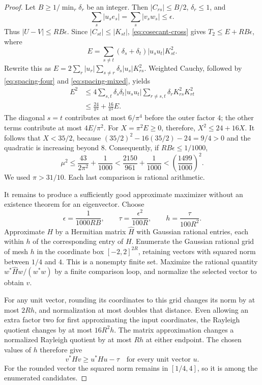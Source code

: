 \begin{proof}
Let $B\geq1/\min_r\delta_r$ be an integer.  Then
$|C_{rs}|\leq B/2$, $\delta_r\leq1$, and
\[
 \sum_s|u_se_s|=\sum_s|v_sw_s|\leq\epsilon.
\]
Thus $|U-V|\leq RB\epsilon$.  Since $|C_{st}|\leq|K_{st}|$,
\eqref{eq:cosecant-cross} gives $T_2\leq E+RB\epsilon$, where
\[
 E=\sum_{s\ne t}(\delta_s+\delta_t)|u_su_t|K_{st}^2.
\]
Rewrite this as
$E=2\sum_r|u_r|\sum_{s\ne r}\delta_s|u_s|K_{rs}^2$.
Weighted Cauchy, followed by
\eqref{eq:spacing-four} and \eqref{eq:spacing-mixed}, yields
\begin{align*}
 E^2
 &\leq4\sum_{s,t}\delta_s\delta_t|u_su_t|
           \sum_{r\ne s,t}\delta_rK_{rs}^2K_{rt}^2\\
 &\leq\frac{24}{\pi^4}+\frac{16}{\pi^2}E.
\end{align*}
The diagonal $s=t$ contributes at most $6/\pi^4$ before the
outer factor $4$; the other terms contribute at most $4E/\pi^2$.
For $X=\pi^2E\geq0$, therefore, $X^2\leq24+16X$.
It follows that $X<35/2$, because
$(35/2)^2-16(35/2)-24=9/4>0$ and the quadratic is increasing
beyond $8$.  Consequently, if $RB\epsilon\leq1/1000$,
\begin{equation}
 \mu^2\leq\frac{43}{2\pi^2}+\frac1{1000}
 <\frac{2150}{961}+\frac1{1000}
 <\left(\frac{1499}{1000}\right)^2.
 \label{eq:approximate-spectral-bound}
\end{equation}
We used $\pi>31/10$.  Each last comparison is rational arithmetic.

It remains to produce a sufficiently good approximate maximizer
without an existence theorem for an eigenvector.  Choose
\[
 \epsilon=\frac1{1000RB},\qquad
 \tau=\frac{\epsilon^2}{100R},\qquad
 h=\frac{\tau}{100R^2}.
\]
Approximate $H$ by a Hermitian matrix $\widehat H$ with Gaussian
rational entries, each within $h$ of the corresponding entry of
$H$.  Enumerate the Gaussian rational grid of mesh $h$ in the
coordinate box $[-2,2]^{2R}$, retaining vectors with squared norm
between $1/4$ and $4$.  This is a nonempty finite set.  Maximize
the rational quantity
$w^*\widehat H w/(w^*w)$ by a finite comparison loop, and normalize
the selected vector to obtain $v$.

For any unit vector, rounding its coordinates to this grid changes
its norm by at most $2Rh$, and normalization at most doubles that
distance.  Even allowing an extra factor two for first approximating
the input coordinates, the Rayleigh quotient changes by at most
$16R^2h$.  The matrix approximation changes a normalized Rayleigh
quotient by at most $Rh$ at either endpoint.  The chosen values of
$h$ therefore give
\begin{equation}
 v^*Hv\geq u^*Hu-\tau
 \quad\text{for every unit vector }u.
 \label{eq:grid-maximizer}
\end{equation}
For the rounded vector the squared norm remains in $[1/4,4]$,
so it is among the enumerated candidates.


\end{proof}
